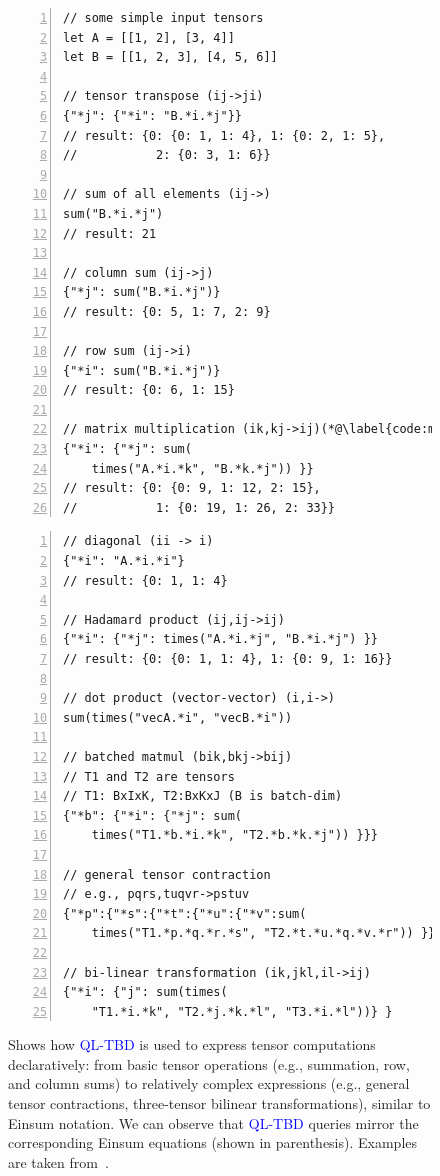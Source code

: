 \documentclass[runningheads]{llncs}
\newcommand{\lang}{\textcolor{blue}{QL-TBD}}
\begin{document}
\begin{figure}[t]
\begin{minipage}{0.5\textwidth}
\begin{lstlisting}[style=JavaScript, columns=flexible, numbers=left]
// some simple input tensors
let A = [[1, 2], [3, 4]]
let B = [[1, 2, 3], [4, 5, 6]]

// tensor transpose (ij->ji)
{"*j": {"*i": "B.*i.*j"}}
// result: {0: {0: 1, 1: 4}, 1: {0: 2, 1: 5},
//           2: {0: 3, 1: 6}}

// sum of all elements (ij->)
sum("B.*i.*j")
// result: 21

// column sum (ij->j)
{"*j": sum("B.*i.*j")}
// result: {0: 5, 1: 7, 2: 9}

// row sum (ij->i)
{"*i": sum("B.*i.*j")}
// result: {0: 6, 1: 15}

// matrix multiplication (ik,kj->ij)(*@\label{code:matmulquery}@*)
{"*i": {"*j": sum(
    times("A.*i.*k", "B.*k.*j")) }}
// result: {0: {0: 9, 1: 12, 2: 15},
//           1: {0: 19, 1: 26, 2: 33}}
\end{lstlisting}
\end{minipage}
\begin{minipage}{0.5\textwidth}
\begin{lstlisting}[style=JavaScript, columns=flexible, numbers=left, firstnumber=last]
// diagonal (ii -> i)
{"*i": "A.*i.*i"}
// result: {0: 1, 1: 4}

// Hadamard product (ij,ij->ij)
{"*i": {"*j": times("A.*i.*j", "B.*i.*j") }}
// result: {0: {0: 1, 1: 4}, 1: {0: 9, 1: 16}}

// dot product (vector-vector) (i,i->)
sum(times("vecA.*i", "vecB.*i"))

// batched matmul (bik,bkj->bij)
// T1 and T2 are tensors
// T1: BxIxK, T2:BxKxJ (B is batch-dim)
{"*b": {"*i": {"*j": sum(
    times("T1.*b.*i.*k", "T2.*b.*k.*j")) }}}

// general tensor contraction
// e.g., pqrs,tuqvr->pstuv
{"*p":{"*s":{"*t":{"*u":{"*v":sum(
    times("T1.*p.*q.*r.*s", "T2.*t.*u.*q.*v.*r")) }}}}}

// bi-linear transformation (ik,jkl,il->ij)
{"*i": {"j": sum(times(
    "T1.*i.*k", "T2.*j.*k.*l", "T3.*i.*l"))} }
\end{lstlisting}
\end{minipage}
\caption{
Shows how \lang{} is used to express tensor computations declaratively:
from basic tensor operations (e.g., summation, row, and column sums) to relatively complex expressions
(e.g., general tensor contractions, three-tensor bilinear transformations), similar
to Einsum notation.
We can observe that \lang{} queries
mirror the corresponding Einsum equations (shown in parenthesis).
Examples are taken from~\cite{einsumblog}.
}\label{fig:tensors}
\end{figure}
\end{document}
